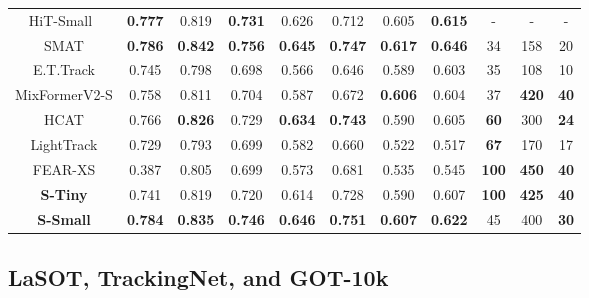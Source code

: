 \begin{table}
{\begin{tabular}{c |c c  c |c c |c c |c c c}
	HiT-Small~\cite{kang2023exploring} & \color{ForestGreen} \bf{0.777} & 0.819 & \color{ForestGreen} \bf{0.731} & 0.626 & 0.712 & 0.605 & \color{ForestGreen} \bf{0.615} & - & - & -\\
	SMAT \cite{gopal2024separable} &  \color{Mahogany} \bf{0.786} &  \color{Mahogany} \bf{0.842}  &  \color{Mahogany} \bf{0.756} &  \color{RoyalBlue} \bf{0.645}  &  \color{RoyalBlue} \bf{0.747} &  \color{Mahogany} \bf{0.617}  &  \color{Mahogany} \bf{0.646}  & 34 & 158 & 20 \\
	E.T.Track \cite{blatter2023efficient} & 0.745  & 0.798  & 0.698 & 0.566  & 0.646 & 0.589  & 0.603 & 35 & 108 & 10 \\
	MixFormerV2-S \cite{cui2024mixformerv2} & 0.758  & 0.811  & 0.704 & 0.587  & 0.672 & \color{ForestGreen} \bf{0.606}  & 0.604  & 37 & \color{ForestGreen} \bf{420} & \color{Mahogany} \bf{40} \\
	HCAT \cite{chen2022efficient} & 0.766  & \color{ForestGreen} \bf{0.826}  & 0.729 & \color{ForestGreen} \bf{0.634}  & \color{ForestGreen} \bf{0.743} & 0.590  & 0.605 & \color{ForestGreen} \bf{60} & 300 & \color{ForestGreen} \bf{24} \\
	LightTrack \cite{yan2021lighttrack} & 0.729  & 0.793  & 0.699 & 0.582  & 0.660  & 0.522  & 0.517 & \color{RoyalBlue} \bf{67} & 170 & 17 \\
	FEAR-XS \cite{borsuk2022fear} & 0.387 & 0.805 & 0.699 & 0.573  & 0.681  & 0.535  & 0.545 &  \color{Mahogany} \bf{100} & \color{Mahogany} \bf{450} & \color{Mahogany} \bf{40}\\
  
	
	\rowcolor{lightgray!20} \bf{S-Tiny}  & 0.741  & 0.819  & 0.720 & 0.614  & 0.728 & 0.590  &  0.607  &  \color{Mahogany} \bf{100} & \color{RoyalBlue} \bf{425} & \color{Mahogany} \bf{40}\\
	\rowcolor{lightgray!20} \bf{S-Small} & \color{RoyalBlue} \bf{0.784}  & \color{RoyalBlue} \bf{0.835}  & \color{RoyalBlue} \bf{0.746} & \color{Mahogany} \bf{0.646}  &  \color{Mahogany} \bf{0.751}  & \color{RoyalBlue} \bf{0.607}  & \color{RoyalBlue} \bf{0.622}  &  45 & 400 & \color{RoyalBlue} \bf{30}\\
	\hline
	\end{tabular}
	}
  \end{table}

  \subsection{LaSOT, TrackingNet, and GOT-10k}
  
